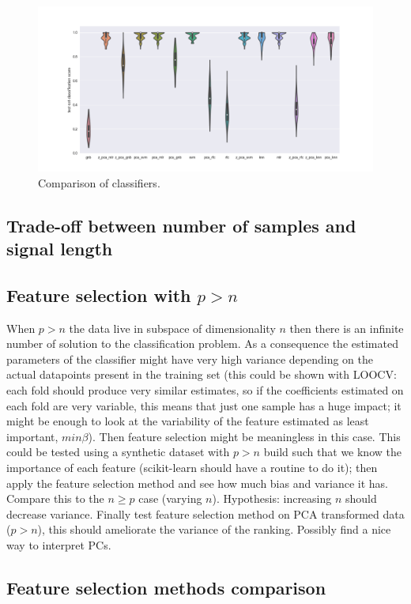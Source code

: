 \documentclass[12pt, a4paper, final, fleqn]{article}
\begin{document}
\begin{figure}[!htb]
\begin{center}
\includegraphics[width=0.89\columnwidth]{comparison_clf_subj_moviedata}
  \caption[Comparison of classifiers]{Comparison of classifiers.
	  \label{fig:clf_comp}}
\end{center}
\end{figure}
\subsection{Trade-off between number of samples and signal length}
\subsection{Feature selection with $p>n$}
When $p>n$ the data live in subspace of dimensionality $n$ then there is an infinite number of solution to the classification
problem. As a consequence the estimated parameters of the classifier might have very high variance depending on the actual
datapoints present in the training set (this could be shown with LOOCV: each fold should produce very similar estimates, so
if the coefficients estimated on each fold are very variable, this means that just one sample has a huge impact; it might be enough to look
at the variability of the feature estimated as least important, $min \beta$).
Then feature selection might be meaningless in this case. This could be tested using a synthetic dataset with $p>n$ build such that we know
the importance of each feature (scikit-learn should have a routine to do it); then apply the feature selection method and see how much bias
and variance it has. Compare this to the $n\ge p$ case (varying $n$). Hypothesis: increasing $n$ should decrease variance.
Finally test feature selection method on PCA transformed data ($p>n$), this should ameliorate the variance of the ranking. Possibly find a nice
way to interpret PCs.

\subsection{Feature selection methods comparison}
\end{document}
